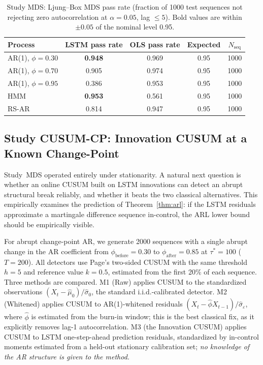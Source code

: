 \documentclass[bj,authoryear]{imsart}
\theoremstyle{plain}
\theoremstyle{definition}
\begin{document}
\begin{table}[ht]
\centering
\caption{Study MDS: Ljung--Box MDS pass rate (fraction of 1000 test sequences
  not rejecting zero autocorrelation at $\alpha = 0.05$, lag $\leq 5$).
  Bold values are within $\pm 0.05$ of the nominal level 0.95.}
\label{tab:mds}
\begin{tabular}{lcccc}
\toprule
Process & LSTM pass rate & OLS pass rate & Expected & $N_\text{seq}$ \\
\midrule
AR(1), $\phi = 0.30$ & \textbf{0.948} & 0.969 & 0.95 & 1000 \\
AR(1), $\phi = 0.70$ & 0.905          & 0.974 & 0.95 & 1000 \\
AR(1), $\phi = 0.95$ & 0.386          & 0.953 & 0.95 & 1000 \\
HMM                  & \textbf{0.953} & 0.561 & 0.95 & 1000 \\
RS-AR                & 0.814          & 0.947 & 0.95 & 1000 \\
\bottomrule
\end{tabular}
\end{table}

\subsection{Study CUSUM-CP: Innovation CUSUM at a Known Change-Point}
\label{sec:cusum-cp}

Study~MDS operated entirely under stationarity.  A natural next question is
whether an online CUSUM built on LSTM innovations can detect an abrupt
structural break reliably, and whether it beats the two classical alternatives.
This empirically examines the prediction of Theorem~\ref{thm:arl}: if the LSTM residuals approximate
a martingale difference sequence in-control, the ARL lower bound should be
empirically visible.

For abrupt change-point AR, we generate 2000 sequences with a single abrupt change in the AR coefficient
from $\phi_{\mathrm{before}} = 0.30$ to $\phi_{\mathrm{after}} = 0.85$ at
$\tau^* = 100$ ($T = 200$).
All detectors use Page's two-sided CUSUM \citep{page1954continuous,lorden1971procedures} with
the same threshold $h = 5$ and reference value $k = 0.5$,
estimated from the first 20\% of each sequence.
Three methods are compared.  M1 (Raw) applies CUSUM to the standardized
observations $(X_t - \hat\mu_0)/\hat\sigma_0$, the standard i.i.d.-calibrated
detector.  M2 (Whitened) applies CUSUM to AR(1)-whitened residuals
$(X_t - \hat\phi X_{t-1})/\hat\sigma_\varepsilon$, where $\hat\phi$ is
estimated from the burn-in window; this is the best classical fix, as it
explicitly removes lag-1 autocorrelation.  M3 (the Innovation CUSUM) applies CUSUM to
LSTM one-step-ahead prediction residuals, standardized by in-control moments
estimated from a held-out stationary calibration set; \emph{no knowledge of
the AR structure is given to the method.}
\end{document}
